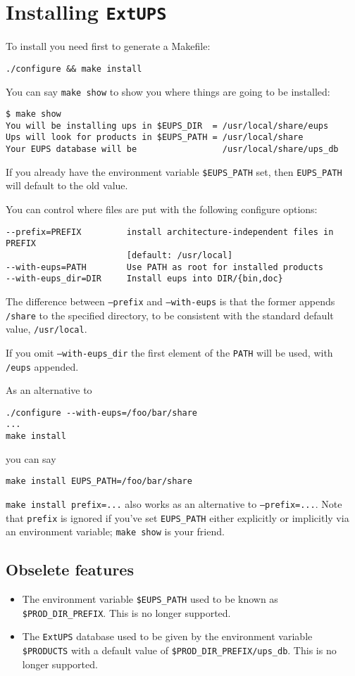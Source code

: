 \documentclass{article}
\newcommand{\code}[1]{\texttt{#1}}
\newcommand{\eups}{\code{ExtUPS}}
\begin{document}
\section{Installing \eups{}}
  
  To install you need first to generate a Makefile:
\begin{verbatim}
./configure && make install
\end{verbatim}

You can say \code{make show} to show you where things are
going to be installed:
\begin{verbatim}
$ make show
You will be installing ups in $EUPS_DIR  = /usr/local/share/eups
Ups will look for products in $EUPS_PATH = /usr/local/share
Your EUPS database will be                 /usr/local/share/ups_db
\end{verbatim} %
If you already have the environment variable \code{\$EUPS\_PATH} set,
then \code{EUPS\_PATH} will default to the old value.

You can control where files are put with the following configure options:
\begin{verbatim}
--prefix=PREFIX         install architecture-independent files in PREFIX
                        [default: /usr/local]
--with-eups=PATH        Use PATH as root for installed products
--with-eups_dir=DIR     Install eups into DIR/{bin,doc}
\end{verbatim}
The difference between \code{--prefix} and \code{--with-eups}
is that the former appends \code{/share} to the specified directory, to
be consistent with the standard default value, \code{/usr/local}.

If you omit \code{--with-eups\_dir} the first element of the \code{PATH}
will be used, with \code{/eups} appended.
  
As an alternative to
\begin{verbatim}
./configure --with-eups=/foo/bar/share
...
make install
\end{verbatim}
you can say
\begin{verbatim}
make install EUPS_PATH=/foo/bar/share
\end{verbatim}
\code{make install prefix=...} also works as an alternative to \code{--prefix=...}.
Note that \code{prefix} is ignored if you've set \code{EUPS\_PATH} either explicitly
or implicitly via an environment variable; \code{make show} is your friend.

\subsection{Obselete features}

\begin{itemize}
  \item The environment variable \code{\$EUPS\_PATH} used to be known
  as \code{\$PROD\_DIR\_PREFIX}. This is no longer supported.

  \item The \eups{} database used to be given by the environment variable \code{\$PRODUCTS}
    with a default value of \code{\$PROD\_DIR\_PREFIX/ups\_db}. This is no longer supported.
\end{itemize}
\end{document}
